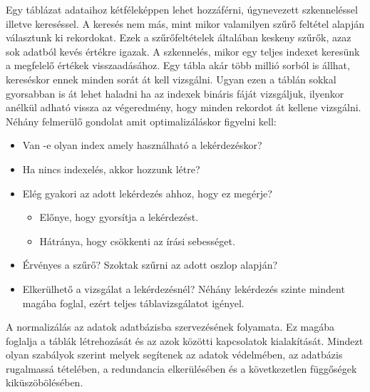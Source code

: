 

Egy táblázat adataihoz kétféleképpen lehet hozzáférni, úgynevezett szkenneléssel illetve kereséssel. A keresés nem más, mint mikor valamilyen szűrő feltétel alapján választunk ki rekordokat. Ezek a szűrőfeltételek általában keskeny szűrők, azaz sok adatból kevés értékre igazak. A szkennelés, mikor egy teljes indexet keresünk a megfelelő értékek visszaadásához. Egy tábla akár több millió sorból is állhat, kereséskor ennek minden sorát át kell vizsgálni. Ugyan ezen a táblán sokkal gyorsabban is át lehet haladni ha az indexek bináris fáját vizsgáljuk, ilyenkor anélkül adható vissza az végeredmény, hogy minden rekordot át kellene vizsgálni.
Néhány felmerülő gondolat amit optimalizáláskor figyelni kell: \cite{index}
\begin{itemize}
\item Van -e olyan index amely használható a lekérdezéskor?
\item Ha nincs indexelés, akkor hozzunk létre?
\item Elég gyakori az adott lekérdezés ahhoz, hogy ez megérje?
\begin{itemize}
\item Előnye, hogy gyorsítja a lekérdezést.
\item Hátránya, hogy csökkenti az írási sebességet.
\end{itemize}
\item Érvényes a szűrő? Szoktak szűrni az adott oszlop alapján?
\item Elkerülhető a vizsgálat a lekérdezésnél? Néhány lekérdezés szinte mindent magába foglal, ezért teljes táblavizsgálatot igényel.
\end{itemize}






A normalizálás az adatok adatbázisba szervezésének folyamata. Ez magába foglalja a táblák létrehozását és az azok közötti kapcsolatok kialakítását. Mindezt olyan szabályok szerint melyek segítenek az adatok védelmében, az adatbázis rugalmassá tételében, a redundancia elkerülésében és a következetlen függőségek kiküszöbölésében.

